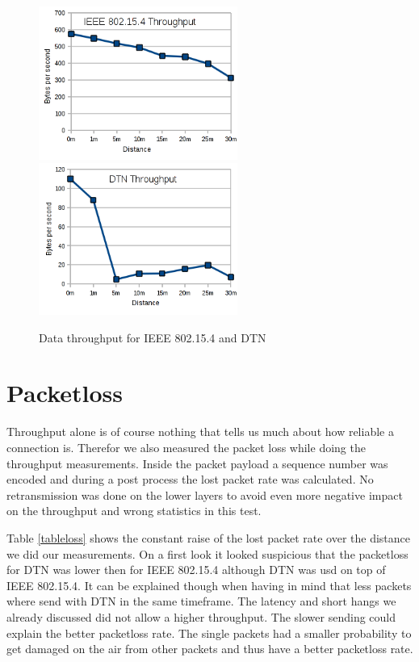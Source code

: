 \begin{figure}
  \begin{center}
    \includegraphics[width=6.5cm]{images/throughput_802154}
    \includegraphics[width=6.5cm]{images/throughput_dtn}
    \caption{Data throughput for IEEE 802.15.4 and DTN}
    \label{fig:throughput}
  \end{center}
\end{figure}

\section{Packetloss}
Throughput alone is of course nothing that tells us much about how reliable a
connection is. Therefor we also measured the packet loss while doing the
throughput measurements. Inside the packet payload a sequence number was encoded
and during a post process the lost packet rate was calculated. No retransmission
was done on the lower layers to avoid even more negative impact on the
throughput and wrong statistics in this test.

Table \ref{tableloss} shows the constant raise of the lost packet rate over the
distance we did our measurements. On a first look it looked suspicious that the
packetloss for DTN was lower then for IEEE 802.15.4 although DTN was usd on top
of IEEE 802.15.4. It can be explained though when having in mind that less
packets where send with DTN in the same timeframe. The latency and short hangs
we already discussed did not allow a higher throughput. The slower sending could
explain the better packetloss rate. The single packets had a smaller probability
to get damaged on the air from other packets and thus have a better packetloss
rate.

